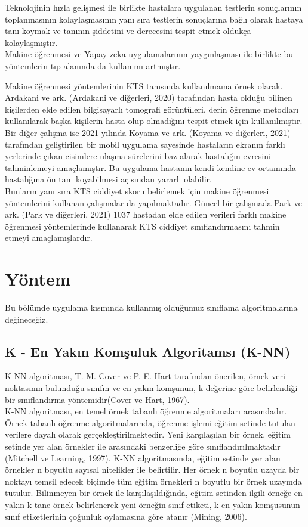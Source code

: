 \documentclass[12pt,twoside]{deuthesis}
\begin{document}
Teknolojinin hızla gelişmesi ile birlikte hastalara uygulanan testlerin sonuçlarının toplanmasının kolaylaşmasının yanı sıra testlerin sonuçlarına bağlı olarak hastaya tanı koymak ve tanının şiddetini ve derecesini tespit etmek oldukça kolaylaşmıştır.\\
Makine öğrenmesi ve Yapay zeka uygulamalarının yaygınlaşması ile birlikte bu yöntemlerin tıp alanında da kullanımı artmıştır.

Makine öğrenmesi yöntemlerinin KTS tanısında kullanılmaına örnek olarak.
Ardakani ve ark. (Ardakani ve diğerleri, 2020) tarafından hasta olduğu bilinen kişilerden elde edilen bilgisayarlı tomografi görüntüleri, derin öğrenme metodları kullanılarak başka kişilerin hasta olup olmadığını tespit etmek için kullanılmıştır.\\
Bir diğer çalışma ise 2021 yılında Koyama ve ark. (Koyama ve diğerleri, 2021) tarafından geliştirilen bir mobil uygulama sayesinde hastaların ekranın farklı yerlerinde çıkan cisimlere ulaşma sürelerini baz alarak hastalığın evresini tahminlemeyi amaçlamıştır. Bu uygulama hastanın kendi kendine ev ortamında hastalığına ön tanı koyabilmesi açısından yararlı olabilir.\\
Bunların yanı sıra KTS ciddiyet skoru belirlemek için makine öğrenmesi yöntemlerini kullanan çalışmalar da yapılmaktadır.
Güncel bir çalışmada Park ve ark. (Park ve diğerleri, 2021) 1037 hastadan elde edilen verileri farklı makine öğrenmesi yöntemlerinde kullanarak KTS ciddiyet sınıflandırmasını tahmin etmeyi amaçlamışlardır.

\hypertarget{yontem}{%
\chapter{Yöntem}\label{yontem}}

Bu bölümde uygulama kısmında kullanmış olduğumuz sınıflama algoritmalarına değineceğiz.

\hypertarget{knn}{%
\section{K - En Yakın Komşuluk Algoritamsı (K-NN)}\label{knn}}

K-NN algoritması, T. M. Cover ve P. E. Hart tarafından önerilen, örnek veri noktasının bulunduğu sınıfın ve en yakın komşunun, k değerine göre belirlendiği bir sınıflandırma yöntemidir(Cover ve Hart, 1967).\\
K-NN algoritması, en temel örnek tabanlı öğrenme algoritmaları arasındadır. Örnek tabanlı öğrenme algoritmalarında, öğrenme işlemi eğitim setinde tutulan verilere dayalı olarak gerçekleştirilmektedir. Yeni karşılaşılan bir örnek, eğitim setinde yer alan örnekler ile arasındaki benzerliğe göre sınıflandırılmaktadır (Mitchell ve Learning, 1997). K-NN algoritmasında, eğitim setinde yer alan örnekler n boyutlu sayısal nitelikler ile belirtilir. Her örnek n boyutlu uzayda bir noktayı temsil edecek biçimde tüm eğitim örnekleri n boyutlu bir örnek uzayında tutulur. Bilinmeyen bir örnek ile karşılaşıldığında, eğitim setinden ilgili örneğe en yakın k tane örnek belirlenerek yeni örneğin sınıf etiketi, k en yakın komşusunun sınıf etiketlerinin çoğunluk oylamasına göre atanır (Mining, 2006).
\end{document}
